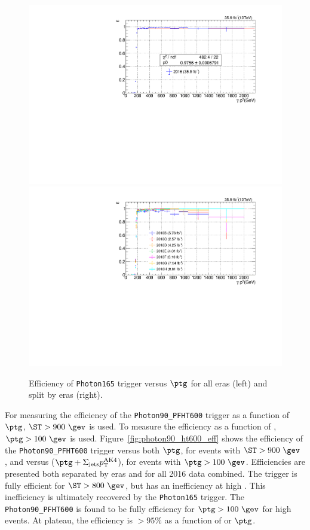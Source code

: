 \begin{figure}[htbp!]
  \centering
  \includegraphics[width=0.48\linewidth]{../Figures/Chap3/triggers/photon165_eff_allEras.pdf}
  \includegraphics[width=0.48\linewidth]{../Figures/Chap3/triggers/photon165_eff_versusEra.pdf}
  \captionsetup{width=.9\linewidth}
  \caption[Photon165 trigger efficiency]{Efficiency of \texttt{Photon165} trigger versus $\ptg$ for all eras (left) and split by eras (right).}
  \label{fig:photon165_eff}
\end{figure}

For measuring the efficiency of the \texttt{Photon90\_PFHT600} trigger as a function of $\ptg$, $\ST>900~\gev$ is used. To measure the efficiency as a function of \ST, $\ptg>100~\gev$ is used. Figure~\ref{fig:photon90_ht600_eff} shows the efficiency of the \texttt{Photon90\_PFHT600} trigger versus
both $\ptg$, for events with $\ST>900~\gev$ , and versus \ST ($\ptg + \Sigma_{\text{jets}} \pt^{\text{AK4}}$), for events with $\ptg>100~\gev$.  Efficiencies are presented both separated by eras and for all 2016 data combined.  The trigger is fully efficient for $\ST>800~\gev$, but has an inefficiency at high \ST.  
This inefficiency is ultimately recovered by the \texttt{Photon165} trigger.  The
\texttt{Photon90\_PFHT600} is found to be fully efficiency for $\ptg>100~\gev$
for high \ST events. At plateau, the efficiency is $>95\%$ as a function of \ST or $\ptg$.


